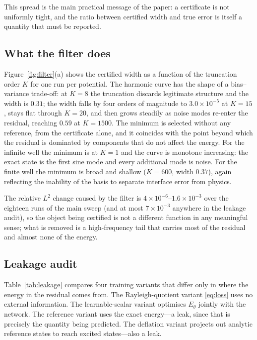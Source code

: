 This spread is the main practical message of the paper: a certificate is not
uniformly tight, and the ratio between certified width and true error is
itself a quantity that must be reported.

\subsection{What the filter does}
\label{sec:filter-results}

Figure~\ref{fig:filter}(a) shows the certified width as a function of the
truncation order $K$ for one run per potential. The harmonic curve has the
shape of a bias--variance trade-off: at $K=8$ the truncation discards
legitimate structure and the width is $0.31$; the width falls by four orders
of magnitude to $3.0\times10^{-5}$ at $K=15$, stays flat through $K=20$, and
then grows steadily as noise modes re-enter the residual, reaching $0.59$ at
$K=1500$. The minimum is selected without any reference, from the certificate
alone, and it coincides with the point beyond which the residual is dominated
by components that do not affect the energy. For the infinite well the
minimum is at $K=1$ and the curve is monotone increasing: the exact state is
the first sine mode and every additional mode is noise. For the finite well
the minimum is broad and shallow ($K=600$, width $0.37$), again reflecting the
inability of the basis to separate interface error from physics.

The relative $L^2$ change caused by the filter is
$4\times10^{-6}$--$1.6\times10^{-3}$ over the eighteen runs of the main sweep
(and at most $7\times10^{-3}$ anywhere in the leakage audit), so the object
being certified is not a different function in any
meaningful sense; what is removed is a high-frequency tail that carries most
of the residual and almost none of the energy.

\subsection{Leakage audit}
\label{sec:leak-results}

Table~\ref{tab:leakage} compares four training variants that differ only in
where the energy in the residual comes from. The Rayleigh-quotient variant
\eqref{eq:loss} uses no external information. The learnable-scalar variant
optimises $E_\theta$ jointly with the network. The reference variant uses the
exact energy---a leak, since that is precisely the quantity being predicted.
The deflation variant projects out analytic reference states to reach excited
states---also a leak.

